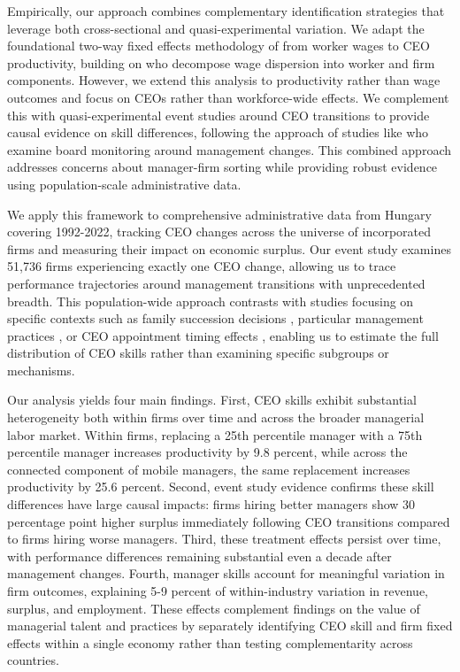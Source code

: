 \documentclass[11pt,a4paper]{article}
\begin{document}
Empirically, our approach combines complementary identification strategies that leverage both cross-sectional and quasi-experimental variation. We adapt the foundational two-way fixed effects methodology of \citet{abowd1999high} from worker wages to CEO productivity, building on \citet{card2018firms} who decompose wage dispersion into worker and firm components. However, we extend this analysis to productivity rather than wage outcomes and focus on CEOs rather than workforce-wide effects. We complement this with quasi-experimental event studies around CEO transitions to provide causal evidence on skill differences, following the approach of studies like \citet{cornelli2013monitoring} who examine board monitoring around management changes. This combined approach addresses concerns about manager-firm sorting while providing robust evidence using population-scale administrative data.

We apply this framework to comprehensive administrative data from Hungary covering 1992-2022, tracking CEO changes across the universe of incorporated firms and measuring their impact on economic surplus. Our event study examines 51,736 firms experiencing exactly one CEO change, allowing us to trace performance trajectories around management transitions with unprecedented breadth. This population-wide approach contrasts with studies focusing on specific contexts such as family succession decisions \citep{bennedsen2007inside}, particular management practices \citep{feng2025role}, or CEO appointment timing effects \citep{li2024ceo}, enabling us to estimate the full distribution of CEO skills rather than examining specific subgroups or mechanisms.

Our analysis yields four main findings. First, CEO skills exhibit substantial heterogeneity both within firms over time and across the broader managerial labor market. Within firms, replacing a 25th percentile manager with a 75th percentile manager increases productivity by 9.8 percent, while across the connected component of mobile managers, the same replacement increases productivity by 25.6 percent. Second, event study evidence confirms these skill differences have large causal impacts: firms hiring better managers show 30 percentage point higher surplus immediately following CEO transitions compared to firms hiring worse managers. Third, these treatment effects persist over time, with performance differences remaining substantial even a decade after management changes. Fourth, manager skills account for meaningful variation in firm outcomes, explaining 5-9 percent of within-industry variation in revenue, surplus, and employment. These effects complement findings on the value of managerial talent and practices \citep{dejong2022managerial} by separately identifying CEO skill and firm fixed effects within a single economy rather than testing complementarity across countries.
\end{document}
